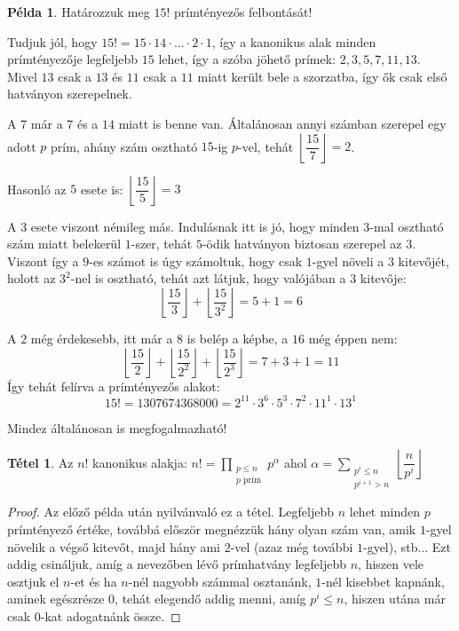\documentclass[12pt]{book}
\theoremstyle{plain} %
\theoremstyle{definition} %
\newtheorem{pl}{Példa}[section]
\newtheorem{theo/}{Tétel}[section]
\newenvironment{theo}
  {\renewcommand{\qedsymbol}{$\clubsuit$}%
   \pushQED{\qed}\begin{theo/}}
  {\popQED\end{theo/}}
\theoremstyle{remark}
\renewcommand\qedsymbol{$\blacksquare$}
\numberwithin{equation}{section}  %
\begin{document}
	\begin{pl}
		Határozzuk meg $15!$ prímtényezős felbontását!
		
		Tudjuk jól, hogy $15! = 15\cdot 14\cdot \ldots \cdot 2\cdot 1$, így a kanonikus alak minden prímtényezője legfeljebb $15$ lehet, így a szóba jöhető prímek: $2, 3, 5, 7, 11, 13$. Mivel $13$ csak a $13$ és $11$ csak a $11$ miatt került bele a szorzatba, így ők csak első hatványon szerepelnek.
		
		A $7$ már a $7$ és a $14$ miatt is benne van. Általánosan annyi számban szerepel egy adott $p$ prím, ahány szám osztható $15$-ig $p$-vel, tehát $\left \lfloor \dfrac{15}{7} \right \rfloor = 2$.
		
		Hasonló az $5$ esete is: $\left \lfloor \dfrac{15}{5} \right \rfloor = 3$
		
		A $3$ esete viszont némileg más. Indulásnak itt is jó, hogy minden $3$-mal osztható szám miatt belekerül $1$-szer, tehát $5$-ödik hatványon biztosan szerepel az $3$. Viszont így a $9$-es számot is úgy számoltuk, hogy csak $1$-gyel növeli a $3$ kitevőjét, holott az $3^2$-nel is osztható, tehát azt látjuk, hogy valójában a $3$ kitevője:
		\[\left \lfloor \dfrac{15}{3} \right \rfloor + \left \lfloor \dfrac{15}{3^2} \right \rfloor  = 5 + 1 = 6 \]
		
		A $2$ még érdekesebb, itt már a $8$ is belép a képbe, a $16$ még éppen nem:
		\[\left \lfloor \dfrac{15}{2} \right \rfloor + \left \lfloor \dfrac{15}{2^2} \right \rfloor + \left \lfloor \dfrac{15}{2^3} \right \rfloor  = 7 + 3 + 1 = 11   \]
		Így tehát felírva a prímtényezős alakot:
		\[ 15! = 1307674368000 = 2^{11} \cdot 3^6 \cdot 5^3 \cdot 7^2 \cdot 11^1 \cdot 13^1  \]
	\end{pl}

	Mindez általánosan is megfogalmazható!

	\begin{theo}\label{faktkan}
		Az $n!$ kanonikus alakja: $ \displaystyle n! = \prod\limits_{\substack{p\leq n \\  p\text{ prím}}} p^\alpha$ ahol $\displaystyle \alpha = \sum\limits_{\substack{p^i\leq n \\ p^{i+1}>n}} \left \lfloor \dfrac{n}{p^i} \right \rfloor$
	\end{theo}

	\begin{proof}
		Az előző példa után nyilvánvaló ez a tétel. Legfeljebb $n$ lehet minden $p$ prímtényező értéke, továbbá először megnézzük hány olyan szám van, amik $1$-gyel növelik a végső kitevőt, majd hány ami $2$-vel (azaz még további $1$-gyel), stb... Ezt addig csináljuk, amíg a nevezőben lévő prímhatvány legfeljebb $n$, hiszen vele osztjuk el $n$-et és ha $n$-nél nagyobb számmal osztanánk, $1$-nél kisebbet kapnánk, aminek egészrésze $0$, tehát elegendő addig menni, amíg $p^i\leq n$, hiszen utána már csak $0$-kat adogatnánk össze.
	\end{proof}
\end{document}
